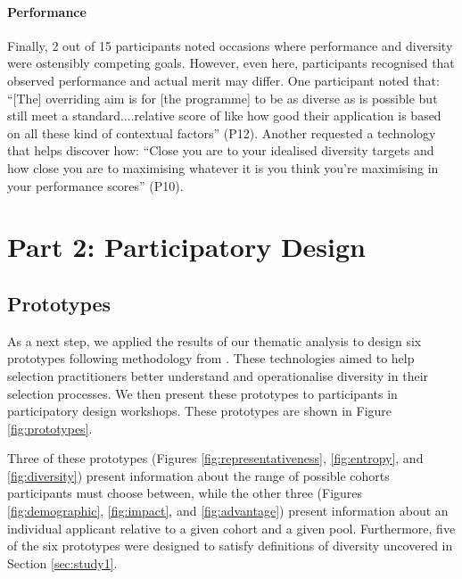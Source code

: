 \paragraph{Performance}
Finally, 2 out of 15 participants noted occasions where performance and diversity were ostensibly competing goals. However, even here, participants recognised that observed performance and actual merit may differ. One participant noted that: ``[The] overriding aim is for [the programme] to be as diverse as is possible but still meet a standard....relative score of like how good their application is based on all these kind of contextual factors'' (P12). Another requested a technology that helps discover how: ``Close you are to your idealised diversity targets and how close you are to maximising whatever it is you think you're maximising in your performance scores'' (P10).

\section{Part 2: Participatory Design}\label{sec:study2}
\subsection{Prototypes}
As a next step, we applied the results of our thematic analysis to design six prototypes following methodology from \textcite{Buchenau_Suri_2000}. These technologies aimed to help selection practitioners better understand and operationalise diversity in their selection processes. We then present these prototypes to participants in participatory design workshops. These prototypes are shown in Figure \ref{fig:prototypes}.

Three of these prototypes (Figures \ref{fig:representativeness}, \ref{fig:entropy}, and \ref{fig:diversity}) present information about the range of possible cohorts participants must choose between, while the other three (Figures \ref{fig:demographic}, \ref{fig:impact}, and \ref{fig:advantage}) present information about an individual applicant relative to a given cohort and a given pool. Furthermore, five of the six prototypes were designed to satisfy definitions of diversity uncovered in Section \ref{sec:study1}.

